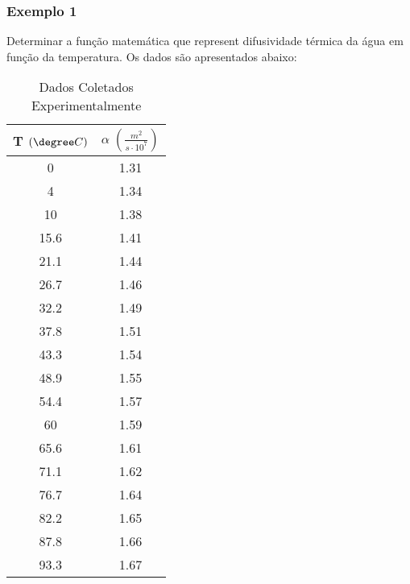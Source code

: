 \subsubsection{Exemplo 1}
Determinar a função matemática que represent difusividade térmica da água em função da temperatura.
Os dados são apresentados abaixo:
\begin{table}[H]
\centering
\begin{tabular}{c|c}
\toprule
T \((\degree C)\)  &  \(\alpha \; \left( \frac{m^{2}}{s \cdot 10^{7} } \right) \)  \\
 \midrule
 0&1.31   \\
  4&1.34 \\
  10&1.38   \\
  15.6&1.41   \\
  21.1&1.44   \\
  26.7&1.46   \\
  32.2&1.49   \\
  37.8&1.51   \\
    43.3&1.54   \\
    48.9&1.55   \\
    54.4&1.57   \\
    60&1.59   \\
    65.6&1.61   \\
    71.1&1.62   \\
    76.7&1.64   \\
    82.2&1.65   \\
    87.8&1.66   \\
    93.3&1.67   \\
\bottomrule
\end{tabular}
\caption{Dados Coletados Experimentalmente}
\label{tab:tabela_dif_ex1}
\end{table}
